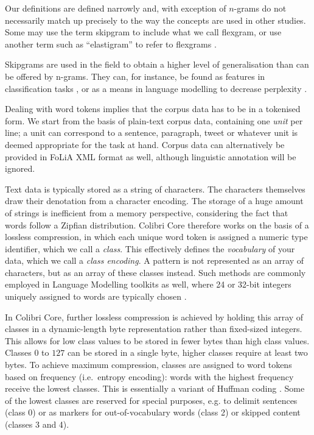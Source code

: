 Our definitions are defined narrowly and, with exception of $n$-grams do not
necessarily match up precisely to the way the concepts are used in other studies. Some
may use the term skipgram to include what we call flexgram, or use another term
such as ``elastigram'' to refer to flexgrams \cite{ForsythS14}.

Skipgrams are used in the field to obtain a higher level of generalisation than
can be offered by n-grams. They can, for instance, be found as features in
classification tasks \cite{DHONDT}, or as a means in language modelling to
decrease perplexity \cite{Guthrie06,COCOCPYP}.

Dealing with word tokens implies that the corpus data has to be in a
tokenised form. We start from the basis of plain-text corpus data, containing one
\emph{unit} per line; a unit can correspond to a sentence, paragraph, tweet
or whatever unit is deemed appropriate for the task at hand. Corpus data can
alternatively be provided in FoLiA XML format \cite{FOLIAPAPER} as well, although linguistic
annotation will be ignored.

Text data is typically stored as a string of characters. The characters
themselves draw their denotation from a character encoding. The storage of a
huge amount of strings is inefficient from a memory perspective, considering
the fact that words follow a Zipfian distribution. Colibri Core therefore works
on the basis of a lossless compression, in which each unique word token is
assigned a numeric type identifier, which we call a \emph{class}. This
effectively defines the \emph{vocabulary} of your data, which we call a
\emph{class encoding}. A pattern is not represented as an array of
characters, but as an array of these classes instead. Such methods are commonly
employed in Language Modelling toolkits as well, where 24 or 32-bit integers
uniquely assigned to words are typically chosen \cite{Guthrie2010}.

In Colibri Core, further lossless compression is achieved by holding this array of
classes in a dynamic-length byte representation rather than fixed-sized
integers. This allows  for low class values to be stored in fewer bytes than
high class values. Classes $0$ to $127$ can be stored in a single byte, higher
classes require at least two bytes. To achieve maximum compression, classes are
assigned to word tokens based on frequency (i.e.\ entropy encoding): words with
the highest frequency receive the lowest classes.  This is essentially a
variant of Huffman coding \citep{HUFFMAN}. Some of the lowest classes are
reserved for special purposes, e.g. to delimit sentences (class 0) or as
markers for out-of-vocabulary words (class 2) or skipped content (classes 3 and
4).

